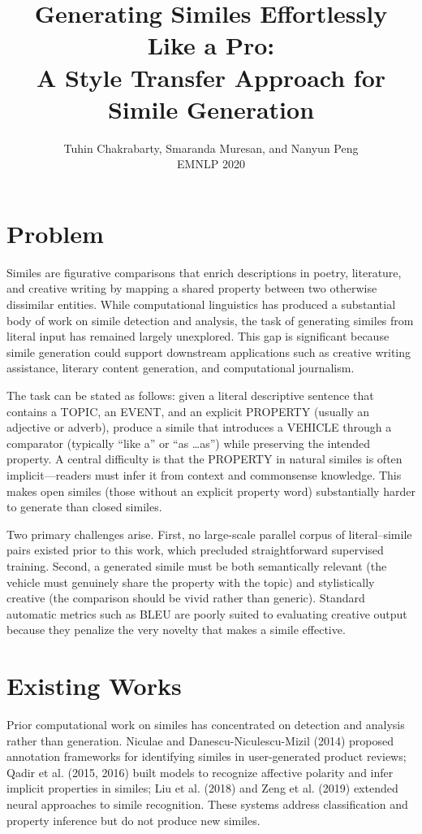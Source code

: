 \documentclass[12pt]{article}
\title{Generating Similes Effortlessly Like a Pro:\\
A Style Transfer Approach for Simile Generation}
\author{Tuhin Chakrabarty, Smaranda Muresan, and Nanyun Peng\\
EMNLP 2020}
\date{}
\begin{document}
\maketitle

\section{Problem}

Similes are figurative comparisons that enrich descriptions in poetry, literature, and creative writing by mapping a shared property between two otherwise dissimilar entities. While computational linguistics has produced a substantial body of work on simile detection and analysis, the task of generating similes from literal input has remained largely unexplored. This gap is significant because simile generation could support downstream applications such as creative writing assistance, literary content generation, and computational journalism.

The task can be stated as follows: given a literal descriptive sentence that contains a TOPIC, an EVENT, and an explicit PROPERTY (usually an adjective or adverb), produce a simile that introduces a VEHICLE through a comparator (typically ``like a'' or ``as \ldots as'') while preserving the intended property. A central difficulty is that the PROPERTY in natural similes is often implicit---readers must infer it from context and commonsense knowledge. This makes open similes (those without an explicit property word) substantially harder to generate than closed similes.

Two primary challenges arise. First, no large-scale parallel corpus of literal--simile pairs existed prior to this work, which precluded straightforward supervised training. Second, a generated simile must be both semantically relevant (the vehicle must genuinely share the property with the topic) and stylistically creative (the comparison should be vivid rather than generic). Standard automatic metrics such as BLEU are poorly suited to evaluating creative output because they penalize the very novelty that makes a simile effective.

\section{Existing Works}

Prior computational work on similes has concentrated on detection and analysis rather than generation. Niculae and Danescu-Niculescu-Mizil (2014) proposed annotation frameworks for identifying similes in user-generated product reviews; Qadir et al. (2015, 2016) built models to recognize affective polarity and infer implicit properties in similes; Liu et al. (2018) and Zeng et al. (2019) extended neural approaches to simile recognition. These systems address classification and property inference but do not produce new similes.
\end{document}
